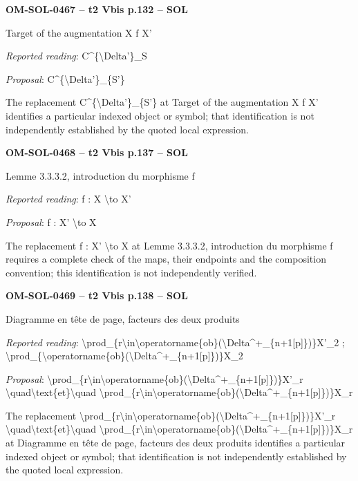 \par\noindent\textbf{OM-SOL-0467 -- t2 Vbis p.132 -- SOL}\par
Target of the augmentation X f X'\par
\emph{Reported reading}: C\textasciicircum{}\{\textbackslash{}Delta'\}\_S\par
\emph{Proposal}: C\textasciicircum{}\{\textbackslash{}Delta'\}\_\{S'\}\par
The replacement C\textasciicircum{}\{\textbackslash{}Delta'\}\_\{S'\} at Target of the augmentation X f X' identifies a particular indexed object or symbol; that identification is not independently established by the quoted local expression.\par
\par\noindent\textbf{OM-SOL-0468 -- t2 Vbis p.137 -- SOL}\par
Lemme 3.3.3.2, introduction du morphisme f\par
\emph{Reported reading}: f : X \textbackslash{}to X'\par
\emph{Proposal}: f : X' \textbackslash{}to X\par
The replacement f : X' \textbackslash{}to X at Lemme 3.3.3.2, introduction du morphisme f requires a complete check of the maps, their endpoints and the composition convention; this identification is not independently verified.\par
\par\noindent\textbf{OM-SOL-0469 -- t2 Vbis p.138 -- SOL}\par
Diagramme en tête de page, facteurs des deux produits\par
\emph{Reported reading}: \textbackslash{}prod\_\{r\textbackslash{}in\textbackslash{}operatorname\{ob\}(\textbackslash{}Delta\textasciicircum{}+\_\{n+1[p]\})\}X'\_2 ; \textbackslash{}prod\_\{\textbackslash{}operatorname\{ob\}(\textbackslash{}Delta\textasciicircum{}+\_\{n+1[p]\})\}X\_2\par
\emph{Proposal}: \textbackslash{}prod\_\{r\textbackslash{}in\textbackslash{}operatorname\{ob\}(\textbackslash{}Delta\textasciicircum{}+\_\{n+1[p]\})\}X'\_r \textbackslash{}quad\textbackslash{}text\{et\}\textbackslash{}quad \textbackslash{}prod\_\{r\textbackslash{}in\textbackslash{}operatorname\{ob\}(\textbackslash{}Delta\textasciicircum{}+\_\{n+1[p]\})\}X\_r\par
The replacement \textbackslash{}prod\_\{r\textbackslash{}in\textbackslash{}operatorname\{ob\}(\textbackslash{}Delta\textasciicircum{}+\_\{n+1[p]\})\}X'\_r \textbackslash{}quad\textbackslash{}text\{et\}\textbackslash{}quad \textbackslash{}prod\_\{r\textbackslash{}in\textbackslash{}operatorname\{ob\}(\textbackslash{}Delta\textasciicircum{}+\_\{n+1[p]\})\}X\_r at Diagramme en tête de page, facteurs des deux produits identifies a particular indexed object or symbol; that identification is not independently established by the quoted local expression.\par
